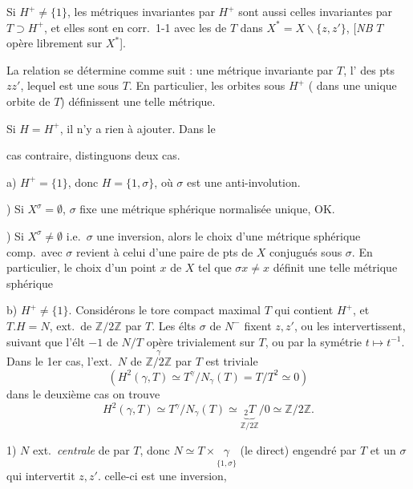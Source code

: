 \documentclass[11pt,a4paper]{article}
\begin{document}
Si $H^{+} \neq \{1\}$, les métriques invariantes par $H^{+}$ sont aussi
celles invariantes par $T \supset H^{+}$, et elles sont en corr.\ 1-1 avec
les   de $T$ dans
$X^{*} = X \smallsetminus \{z, z'\}$, [\emph{NB} $T$ opère librement sur
$X^{*}$].

La relation se détermine comme suit :  une métrique invariante
par $T$, l'  
des pts $z z'$, lequel est une  
sous $T$. En particulier, les orbites sous $H^{+}$ (
dans une unique orbite de $T$) définissent une telle métrique.

Si $H = H^{+}$, il n'y a \struck{\ill{}} rien à ajouter. Dans le


cas contraire, distinguons deux cas.

a) $H^{+} = \{1\}$, donc $H = \{1, \sigma\}$, où $\sigma$ est une
anti-involution.

) Si \struck{\ill{}} $X^{\sigma} = \emptyset$, $\sigma$ fixe une
métrique sphérique normalisée unique, OK.

) Si $X^{\sigma} \neq \emptyset$ i.e.\ $\sigma$ une inversion, alors
le choix d'une métrique sphérique comp.\ avec $\sigma$ revient à celui d'une
paire de pts de $X$ conjugués sous $\sigma$. En particulier, le choix d'un
point $x$ de $X$ tel que $\sigma x \neq x$ définit une telle métrique
sphérique

b) $H^{+} \neq \{1\}$. Considérons le  tore compact
maximal $T$ qui contient $H^{+}$, et $T.H = N$, ext.\ de
\struck{\ill{}} $\mathbb{Z}/2\mathbb{Z}$ par $T$. Les élts $\sigma$ de
$N^{-}$ fixent $z, z'$, ou les intervertissent, suivant que l'élt $-1$ de
$N/T$ opère trivialement sur $T$, ou par la symétrie $t \mapsto t^{-1}$.
Dans le 1er cas, l'ext.\ $N$ de $\overset{\gamma}{\mathbb{Z}/2\mathbb{Z}}$
par $T$ est triviale
\[
  (H^{2}(\gamma, T) \simeq T^{\gamma} / N_{\gamma}(T) = T / T^{2} \simeq 0)
\]
dans le deuxième cas on trouve
\[
  H^{2}(\gamma, T) \simeq T^{\gamma} / N_{\gamma}(T) \simeq
  \underbrace{{}_{2}T}_{\mathbb{Z}/2\mathbb{Z}} / 0 \simeq
  \mathbb{Z}/2\mathbb{Z} .
\]

1) $N$ ext.\ \emph{centrale} de \struck{$\gamma$}
 par $T$, donc
$N \simeq T \times \underset{\{1, \sigma\}}{\gamma}$ (le direct)
engendré par $T$ et un $\sigma$  qui
 intervertit $z, z'$. 
\struck{\ill{}} celle-ci est une inversion, 
\end{document}
